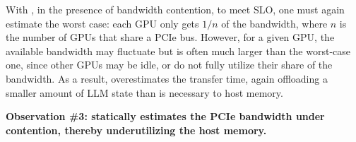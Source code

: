With \flexgen, in the presence of bandwidth contention, to meet SLO, 
one must again estimate the worst case:  
%
each GPU only gets $1/n$ of the bandwidth, where $n$ is the number of GPUs that share a PCIe bus.  
%
However, for a given GPU, the available bandwidth may fluctuate but is often much larger than the worst-case one, since other GPUs may be idle, or do not 
fully utilize their share of the bandwidth. 
%
As a result, \flexgen overestimates the transfer time, again offloading a smaller amount of LLM state than is necessary to host memory. 



\noindent \textbf{Observation \#3: \flexgen statically estimates the PCIe bandwidth under contention, thereby underutilizing the host memory.}

